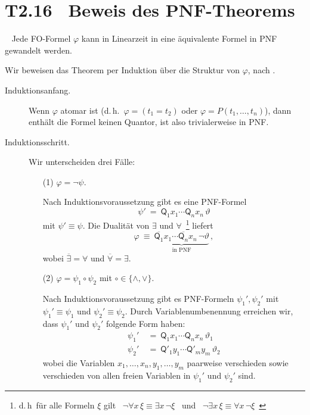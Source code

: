 \documentclass[fontsize=11pt, twoside=false, numbers=autoenddot]{scrbook}
\begin{document}
\section*{T2.16~ Beweis des PNF-Theorems}

~
Jede FO-Formel $\varphi$ kann in Linearzeit in eine äquivalente Formel in PNF gewandelt werden.
%
\begin{beweis}
  Wir beweisen das Theorem
  per Induktion über die Struktur von $\varphi$,
  nach \cite{SkriptGraedel}.
  \begin{description}
    \item[Induktionsanfang.]
      Wenn $\varphi$ atomar ist (d.\,h.\ $\varphi = (t_1 = t_2)$ oder $\varphi = P(t_1,\dots,t_n)$),
      dann enthält die Formel keinen Quantor, ist also trivialerweise in PNF.
    \item[Induktionsschritt.]
      Wir unterscheiden drei Fälle:
      \begin{enumerate}
        \item[(1)]
          $\varphi = \lnot \psi$.
          \par\smallskip
          Nach Induktionsvoraussetzung gibt es eine PNF-Formel
          \[
            \psi' ~=~ \textsf{Q}_1x_1 \cdots \textsf{Q}_nx_n\, \vartheta
          \]
          mit $\psi' \equiv \psi$.
          Die Dualität von $\exists$ und $\forall$\,%
          \footnote{%
            d.\,h\, für alle Formeln $\xi$ gilt
            ~$\lnot \forall x\,\xi \equiv \exists x\, \lnot \xi$~
            und 
            ~$\lnot \exists x\,\xi \equiv \forall x\, \lnot \xi$~
          }
          liefert
          \[
            \varphi ~\equiv~ \underbrace{\overline{\textsf{Q}_1} x_1 \cdots \overline{\textsf{Q}_n} x_n\, \lnot \vartheta}_{\text{in PNF}}\,,
          \]
          wobei $\overline{\exists} = \forall$ und $\overline{\forall} = \exists$.
          \pagebreak
          \par\smallskip
        \item[(2)]
          $\varphi = \psi_1 \circ \psi_2$ mit $\circ \in \{\land,\lor\}$.
          \par\smallskip
          Nach Induktionsvoraussetzung gibt es PNF-Formeln
          $\psi_1',\psi_2'$ mit $\psi_1' \equiv \psi_1$ und $\psi_2' \equiv \psi_2$.
          Durch Variablenumbenennung erreichen wir,
          dass $\psi_1'$ und $\psi_2'$ folgende Form haben:
          \begin{align*}
            \psi_1' & ~=~ \textsf{Q}_1  x_1 \cdots \textsf{Q}_n  x_n \, \vartheta_1 \\
            \psi_2' & ~=~ \textsf{Q}'_1 y_1 \cdots \textsf{Q}'_m y_m \, \vartheta_2
          \end{align*}
          wobei die Variablen $x_1,\dots,x_n,y_1,\dots,y_m$ paarweise verschieden
          sowie verschieden von allen freien Variablen in $\psi_1'$ und $\psi_2'$ sind.


\end{enumerate}
\end{description}
\end{beweis}
\end{document}
